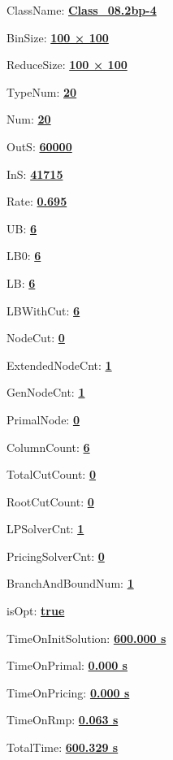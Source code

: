 \documentclass[11pt]{article}
\begin{document}
\pagestyle{empty}


ClassName: \underline{\textbf{Class_08.2bp-4}}
\par
BinSize: \underline{\textbf{100 × 100}}
\par
ReduceSize: \underline{\textbf{100 × 100}}
\par
TypeNum: \underline{\textbf{20}}
\par
Num: \underline{\textbf{20}}
\par
OutS: \underline{\textbf{60000}}
\par
InS: \underline{\textbf{41715}}
\par
Rate: \underline{\textbf{0.695}}
\par
UB: \underline{\textbf{6}}
\par
LB0: \underline{\textbf{6}}
\par
LB: \underline{\textbf{6}}
\par
LBWithCut: \underline{\textbf{6}}
\par
NodeCut: \underline{\textbf{0}}
\par
ExtendedNodeCnt: \underline{\textbf{1}}
\par
GenNodeCnt: \underline{\textbf{1}}
\par
PrimalNode: \underline{\textbf{0}}
\par
ColumnCount: \underline{\textbf{6}}
\par
TotalCutCount: \underline{\textbf{0}}
\par
RootCutCount: \underline{\textbf{0}}
\par
LPSolverCnt: \underline{\textbf{1}}
\par
PricingSolverCnt: \underline{\textbf{0}}
\par
BranchAndBoundNum: \underline{\textbf{1}}
\par
isOpt: \underline{\textbf{true}}
\par
TimeOnInitSolution: \underline{\textbf{600.000 s}}
\par
TimeOnPrimal: \underline{\textbf{0.000 s}}
\par
TimeOnPricing: \underline{\textbf{0.000 s}}
\par
TimeOnRmp: \underline{\textbf{0.063 s}}
\par
TotalTime: \underline{\textbf{600.329 s}}
\par
\newpage


\end{document}
